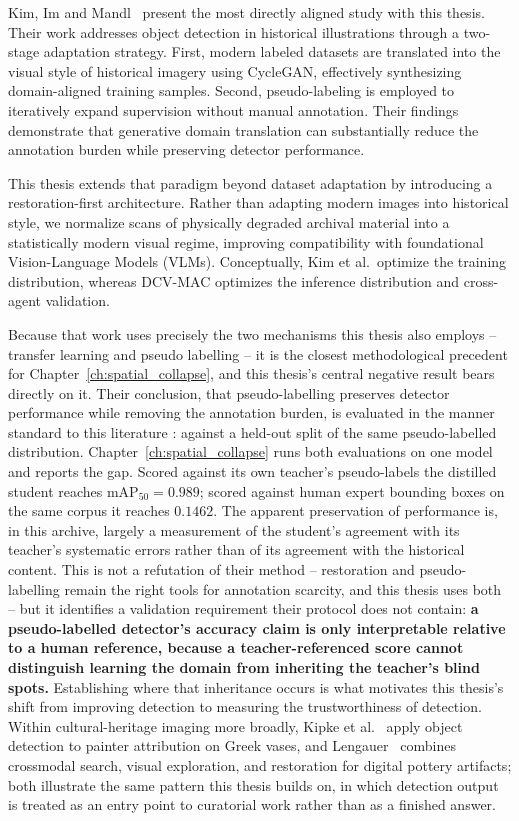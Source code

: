 \documentclass[12pt,a4paper]{report}
\begin{document}
Kim, Im and Mandl~\cite{kim2024historical_od} present the most directly aligned study with this thesis. Their work addresses object detection in historical illustrations through a two-stage adaptation strategy. First, modern labeled datasets are translated into the visual style of historical imagery using CycleGAN, effectively synthesizing domain-aligned training samples. Second, pseudo-labeling is employed to iteratively expand supervision without manual annotation. Their findings demonstrate that generative domain translation can substantially reduce the annotation burden while preserving detector performance.

This thesis extends that paradigm beyond dataset adaptation by introducing a restoration-first architecture. Rather than adapting modern images into historical style, we normalize scans of physically degraded archival material into a statistically modern visual regime, improving compatibility with foundational Vision-Language Models (VLMs). Conceptually, Kim et al.~optimize the training distribution, whereas DCV-MAC optimizes the inference distribution and cross-agent validation.

Because that work uses precisely the two mechanisms this thesis also employs -- transfer learning and pseudo labelling -- it is the closest methodological precedent for Chapter~\ref{ch:spatial_collapse}, and this thesis's central negative result bears directly on it. Their conclusion, that pseudo-labelling preserves detector performance while removing the annotation burden, is evaluated in the manner standard to this literature \cite{pseudo_labeling2013,noisy_student2020}: against a held-out split of the same pseudo-labelled distribution. Chapter~\ref{ch:spatial_collapse} runs both evaluations on one model and reports the gap. Scored against its own teacher's pseudo-labels the distilled student reaches $\text{mAP}_{50}=0.989$; scored against human expert bounding boxes on the same corpus it reaches $0.1462$. The apparent preservation of performance is, in this archive, largely a measurement of the student's agreement with its teacher's systematic errors rather than of its agreement with the historical content. This is not a refutation of their method -- restoration and pseudo-labelling remain the right tools for annotation scarcity, and this thesis uses both -- but it identifies a validation requirement their protocol does not contain: \textbf{a pseudo-labelled detector's accuracy claim is only interpretable relative to a human reference, because a teacher-referenced score cannot distinguish learning the domain from inheriting the teacher's blind spots.} Establishing where that inheritance occurs is what motivates this thesis's shift from improving detection to measuring the trustworthiness of detection. Within cultural-heritage imaging more broadly, Kipke et al.~\cite{kipke2022} apply object detection to painter attribution on Greek vases, and Lengauer~\cite{lengauer2022} combines crossmodal search, visual exploration, and restoration for digital pottery artifacts; both illustrate the same pattern this thesis builds on, in which detection output is treated as an entry point to curatorial work rather than as a finished answer.
\end{document}
